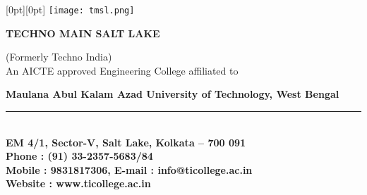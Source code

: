 \thispagestyle{empty}

\begin{adjustwidth}{-0.7cm}{-0.7cm}

\vspace*{-2cm}

\noindent
\begin{minipage}[t]{0.15\textwidth}
    \raisebox{-0.72cm}[0pt][0pt]{%
      \texttt{[image: tmsl.png]}%
    }
\end{minipage}%
\hfill
\begin{minipage}{0.89\textwidth}
  \raggedleft
  {\Huge\bfseries\textcolor{blue!50!black}{TECHNO MAIN SALT LAKE}}\\[0.08em]
  {\fontsize{9.25}{11}\selectfont
  {\selectfont(Formerly Techno India)} \\[0.07em]
  {\fontsize{9.25}{11}\selectfont
    {\selectfont An AICTE approved Engineering College affiliated to} \\[0.07em]
  }
  
  {\fontsize{9.25}{11}\selectfont
    {\selectfont \textbf{Maulana Abul Kalam Azad University of Technology, West Bengal}}
    \\
  }
  
  }
  
  \vspace{-0.7em}
  \textcolor{red!50!black}{\rule{\linewidth}{0.5mm}}
  \\[0.05em]
  {\footnotesize
    \textbf{{\selectfont EM 4/1, Sector-V, Salt Lake, Kolkata – 700 091}} \\[0.07em]
    \textbf{{\selectfont Phone : (91) 33-2357-5683/84}} \\[0.08em]
    \textbf{{\selectfont Mobile : 9831817306, E-mail : info@ticollege.ac.in}} \\[0.07em]
    \noindent\hspace*{\fill}\textbf{{\selectfont Website : www.ticollege.ac.in}} \\[0.07em]
  }
\end{minipage}

\end{adjustwidth}

